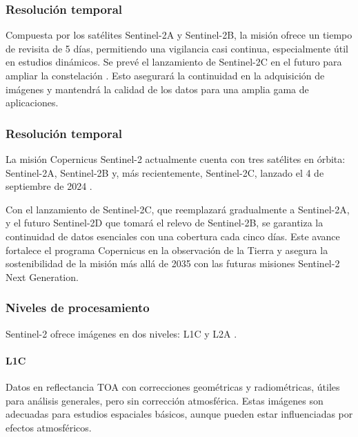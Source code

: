         \subsubsection{Resolución temporal}

            Compuesta por los satélites Sentinel-2A y Sentinel-2B, la misión ofrece un tiempo de revisita de 5 días, permitiendo una vigilancia casi continua, especialmente útil en estudios dinámicos. Se prevé el lanzamiento de Sentinel-2C en el futuro para ampliar la constelación \autocite{Sentinel2C_Copernicus_2024}. Esto asegurará la continuidad en la adquisición de imágenes y mantendrá la calidad de los datos para una amplia gama de aplicaciones.
        
        \subsubsection{Resolución temporal}

            La misión Copernicus Sentinel-2 actualmente cuenta con tres satélites en órbita: Sentinel-2A, Sentinel-2B y, más recientemente, Sentinel-2C, lanzado el 4 de septiembre de 2024 \autocite{Sentinel2C_Copernicus_2024}. 
            
            Con el lanzamiento de Sentinel-2C, que reemplazará gradualmente a Sentinel-2A, y el futuro Sentinel-2D que tomará el relevo de Sentinel-2B, se garantiza la continuidad de datos esenciales con una cobertura cada cinco días. Este avance fortalece el programa Copernicus en la observación de la Tierra y asegura la sostenibilidad de la misión más allá de 2035 con las futuras misiones Sentinel-2 Next Generation.

        \subsubsection{Niveles de procesamiento}

            Sentinel-2 ofrece imágenes en dos niveles: L1C y L2A \autocite{ginting2024comparison}.
            
            \paragraph{L1C}
            Datos en reflectancia TOA con correcciones geométricas y radiométricas, útiles para análisis generales, pero sin corrección atmosférica. Estas imágenes son adecuadas para estudios espaciales básicos, aunque pueden estar influenciadas por efectos atmosféricos.
            
